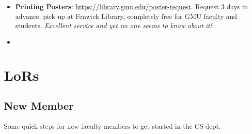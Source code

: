 \documentclass[oneside,11pt]{book}
\begin{document}
\begin{itemize}
  \item \textbf{Printing Posters}: \url{https://library.gmu.edu/poster-request}.  Request 3 days in advance, pick up at Fenwick Library, completely free for GMU faculty and students.  \emph{Excellent service and yet no one seems to know about it!}
  \item 
\end{itemize}  





\appendix
\chapter{LoRs}

\section{New Member}

Some quick steps for new faculty members to get started in the CS dept.
\end{document}
